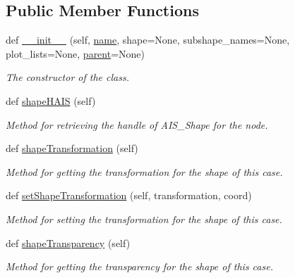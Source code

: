 \subsection*{Public Member Functions}
\begin{DoxyCompactItemize}
\item 
def \hyperlink{classdata__structure_1_1case__node_1_1_case_node_a268359dc0ff12ae9d60b0311f4d20a12}{\+\_\+\+\_\+init\+\_\+\+\_\+} (self, \hyperlink{classdata__structure_1_1case__node_1_1_case_node_a73e2e5313f50260c6c767fef3c4b3ced}{name}, shape=None, subshape\+\_\+names=None, plot\+\_\+lists=None, \hyperlink{classdata__structure_1_1case__node_1_1_case_node_a130f184f648103908a74a8a332f7513f}{parent}=None)
\begin{DoxyCompactList}\small\item\em The constructor of the class. \end{DoxyCompactList}\item 
def \hyperlink{classdata__structure_1_1case__node_1_1_case_node_ad3bd18eb2babab717bc4bd7a48ddbcb2}{shape\+H\+A\+IS} (self)
\begin{DoxyCompactList}\small\item\em Method for retrieving the handle of A\+I\+S\+\_\+\+Shape for the node. \end{DoxyCompactList}\item 
def \hyperlink{classdata__structure_1_1case__node_1_1_case_node_acc05e6147aac463ecd4b8073a050a54e}{shape\+Transformation} (self)
\begin{DoxyCompactList}\small\item\em Method for getting the transformation for the shape of this case. \end{DoxyCompactList}\item 
def \hyperlink{classdata__structure_1_1case__node_1_1_case_node_a4ee5ef91001b2c4db57c268338ef287e}{set\+Shape\+Transformation} (self, transformation, coord)
\begin{DoxyCompactList}\small\item\em Method for setting the transformation for the shape of this case. \end{DoxyCompactList}\item 
def \hyperlink{classdata__structure_1_1case__node_1_1_case_node_a7ee651fb0c3759df3d639ca19f70710d}{shape\+Transparency} (self)
\begin{DoxyCompactList}\small\item\em Method for getting the transparency for the shape of this case. \end{DoxyCompactList}\item 

\end{DoxyCompactItemize}
